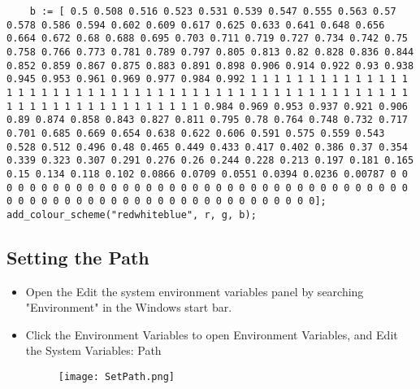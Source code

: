 \documentclass{article}
\newcommand{\Files}[1]{\textcolor{myblue}{#1}}
\begin{document}
\begin{lstlisting}
    b := [ 0.5 0.508 0.516 0.523 0.531 0.539 0.547 0.555 0.563 0.57 0.578 0.586 0.594 0.602 0.609 0.617 0.625 0.633 0.641 0.648 0.656 0.664 0.672 0.68 0.688 0.695 0.703 0.711 0.719 0.727 0.734 0.742 0.75 0.758 0.766 0.773 0.781 0.789 0.797 0.805 0.813 0.82 0.828 0.836 0.844 0.852 0.859 0.867 0.875 0.883 0.891 0.898 0.906 0.914 0.922 0.93 0.938 0.945 0.953 0.961 0.969 0.977 0.984 0.992 1 1 1 1 1 1 1 1 1 1 1 1 1 1 1 1 1 1 1 1 1 1 1 1 1 1 1 1 1 1 1 1 1 1 1 1 1 1 1 1 1 1 1 1 1 1 1 1 1 1 1 1 1 1 1 1 1 1 1 1 1 1 1 1 1 1 0.984 0.969 0.953 0.937 0.921 0.906 0.89 0.874 0.858 0.843 0.827 0.811 0.795 0.78 0.764 0.748 0.732 0.717 0.701 0.685 0.669 0.654 0.638 0.622 0.606 0.591 0.575 0.559 0.543 0.528 0.512 0.496 0.48 0.465 0.449 0.433 0.417 0.402 0.386 0.37 0.354 0.339 0.323 0.307 0.291 0.276 0.26 0.244 0.228 0.213 0.197 0.181 0.165 0.15 0.134 0.118 0.102 0.0866 0.0709 0.0551 0.0394 0.0236 0.00787 0 0 0 0 0 0 0 0 0 0 0 0 0 0 0 0 0 0 0 0 0 0 0 0 0 0 0 0 0 0 0 0 0 0 0 0 0 0 0 0 0 0 0 0 0 0 0 0 0 0 0 0 0 0 0 0 0 0 0 0 0 0 0 0];
add_colour_scheme("redwhiteblue", r, g, b);

\end{lstlisting}

\subsection{Setting the Path} \label{sec:AddToPath}
\begin{itemize}
    \item Open the \Files{Edit the system environment variables} panel by searching "Environment" in the Windows start bar. 
    \item Click the \Files{Environment Variables} to open Environment Variables, and Edit the \Files{System Variables: Path}
        \begin{figure}[h]
        \centering
            \texttt{[image: SetPath.png]}
    \end{figure}
\end{itemize}
\end{document}
